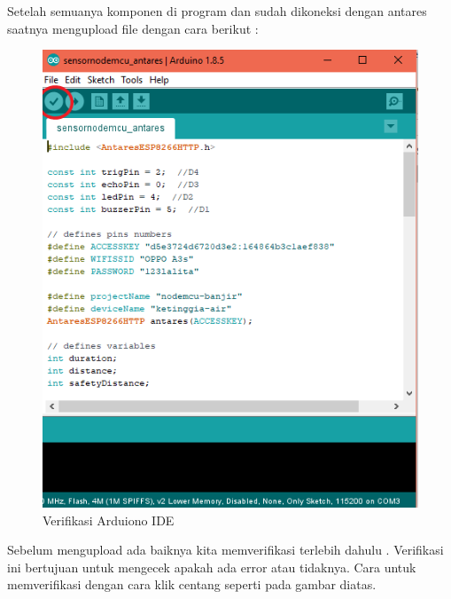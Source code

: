 \begin{enumerate}
    \par Setelah semuanya komponen di program dan sudah dikoneksi dengan antares saatnya mengupload file dengan cara berikut :
    \begin{figure}[H]
    \centering
    \includegraphics[width=1\textwidth]{figures/upload3.png}
    \caption{Verifikasi Arduiono IDE }
    \label{print}
    \end{figure}
    \par Sebelum mengupload ada baiknya kita memverifikasi terlebih dahulu . Verifikasi ini bertujuan untuk mengecek apakah ada error atau tidaknya. Cara untuk memverifikasi dengan cara klik centang seperti pada gambar diatas.
    

\end{enumerate}
